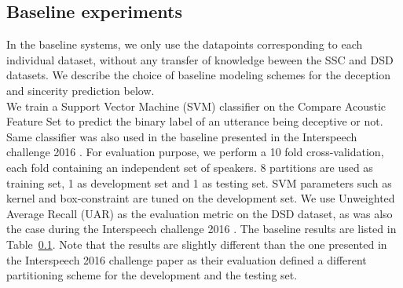 \documentclass{article}
\begin{document}
\subsection{Baseline experiments}

In the baseline systems, we only use the datapoints corresponding to each individual dataset, without any transfer of knowledge beween the SSC and DSD datasets.
We describe the choice of baseline modeling schemes for the deception and sincerity prediction below.
\\

We train a Support Vector Machine (SVM) classifier on the Compare Acoustic Feature Set \cite{} to predict the binary label of an utterance being deceptive or not.
Same classifier was also used in the baseline presented in the Interspeech challenge 2016 \cite{}.
For evaluation purpose, we perform a 10 fold cross-validation, each fold containing an independent set of speakers.  
8 partitions are used as training set, 1 as development set and 1 as testing set.
SVM parameters such as kernel and box-constraint are tuned on the development set.
We use Unweighted Average Recall (UAR) as the evaluation metric on the DSD dataset, as was also the case during the Interspeech challenge 2016 \cite{}. 
The baseline results are listed in Table~\ref{}.
Note that the results are slightly different than the one presented in the Interspeech 2016 challenge paper \cite{} as their evaluation defined a different partitioning scheme for the development and the testing set.
\\
\end{document}
